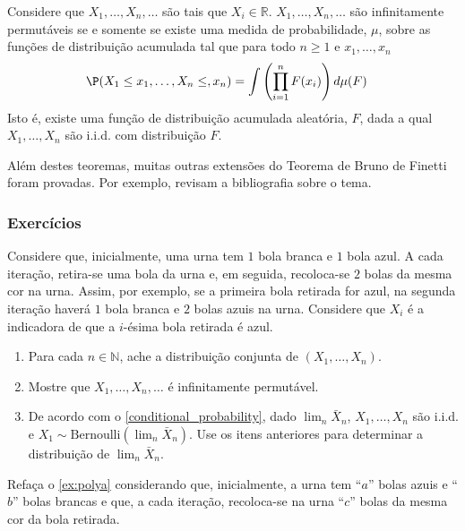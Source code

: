 \begin{theorem}
 \label{thm:definetti-geral}
 Considere que $X_1,\ldots,X_n,\ldots$ são
 tais que $X_i \in \mathbb{R}$.
 $X_1,\ldots,X_n,\ldots$ são
 infinitamente permutáveis se e somente se
 existe uma medida de probabilidade, $\mu$,
 sobre as funções de distribuição acumulada tal que
 para todo $n \geq 1$ e $x_1, \ldots, x_n$
 \begin{align*}
  \P(X_1 \leq x_1, \ldots, X_n \leq, x_n)
  &= \int \left(\prod_{i=1}^n F(x_i)\right) d\mu(F)
 \end{align*}
 Isto é, existe uma função de distribuição acumulada aleatória, $F$,
 dada a qual $X_1, \ldots, X_n$ são i.i.d. com distribuição $F$.
\end{theorem}

Além destes teoremas, muitas outras extensões do 
Teorema de Bruno de Finetti foram provadas.
Por exemplo, \citet{Kingman1978,Aldous1985} revisam
a bibliografia sobre o tema.

\subsubsection*{Exercícios}

\begin{exercise}
 \label{ex:polya}
 Considere que, inicialmente, uma urna tem
 $1$ bola branca e $1$ bola azul. A cada iteração,
 retira-se uma bola da urna e, em seguida, 
 recoloca-se $2$ bolas da mesma cor na urna.
 Assim, por exemplo, se a primeira bola retirada for azul,
 na segunda iteração haverá $1$ bola branca e
 $2$ bolas azuis na urna. Considere que
 $X_{i}$ é a indicadora de que a
 $i$-ésima bola retirada é azul.
 \begin{enumerate}[label=(\alph*)]
  \item Para cada $n \in \mathbb{N}$, ache a
  distribuição conjunta de $(X_{1},\ldots,X_{n})$.
  \item Mostre que $X_{1},\ldots,X_{n},\ldots$ é
  infinitamente permutável.
  \item De acordo com o \cref{conditional_probability},
  dado $\lim_{n}\bar{X}_{n}$,
  $X_{1},\ldots,X_{n}$ são i.i.d. e
  $X_{1} \sim \text{Bernoulli}(\lim_{n}\bar{X}_{n})$.
  Use os itens anteriores para determinar a
  distribuição de $\lim_{n}\bar{X}_{n}$.
 \end{enumerate}
\end{exercise}

\begin{exercise}
 Refaça o \cref{ex:polya} considerando que, inicialmente,
 a urna tem ``$a$'' bolas azuis e
 ``$b$'' bolas brancas e que, a cada iteração,
 recoloca-se na urna ``$c$'' bolas 
 da mesma cor da bola retirada. 
\end{exercise}

